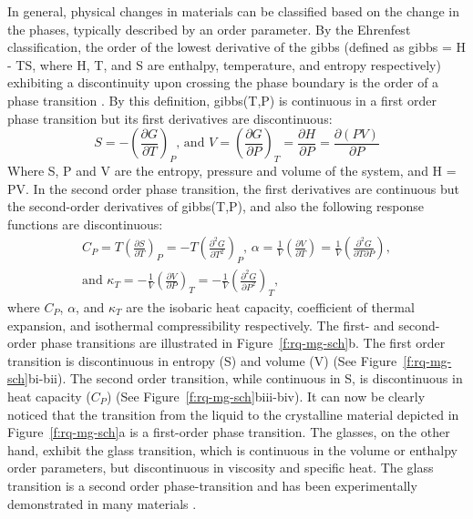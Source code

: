 In general, physical changes in materials can be classified based on the change in the phases, typically described by an order parameter. By the Ehrenfest classification, the order of the lowest derivative of the \glsdesc{gibbs} (defined as \gls{gibbs} = H - TS, where H, T, and S are enthalpy, temperature, and entropy respectively) exhibiting a discontinuity upon crossing the phase boundary is the order of a phase transition \cite{Jaeger1998}. By this definition, \gls{gibbs}(T,P) is continuous in a first order phase transition but its first derivatives are discontinuous:
\begin{equation}
	S = - \left( \frac{\partial G}{\partial T} \right)_P \text{, and } V = \left( \frac{\partial G}{\partial P} \right)_T = \frac{\partial H}{\partial P} =  \frac{\partial (PV)}{\partial P}
\end{equation}
Where S, P and V are the entropy, pressure and volume of the system, and H = PV. In the second order phase transition, the first derivatives are continuous but the second-order derivatives of \gls{gibbs}(T,P), and also the following response functions are discontinuous:
\begin{equation}
\begin{gathered}
C_P = T\left(\frac{\partial S}{\partial T} \right)_P = -T \left( \frac{\partial^2 G}{\partial T^2} \right)_P \text{, } \alpha = \frac{1}{V} \left(\frac{\partial V}{\partial T} \right) = \frac{1}{V} \left(\frac{\partial^2 G}{\partial T \partial P} \right), \\
\text{and }\kappa_T = -\frac{1}{V} \left(\frac{\partial V}{\partial P} \right)_T = -\frac{1}{V} \left( \frac{\partial^2 G}{\partial P^2} \right)_T\text{,}
\end{gathered}
\end{equation}
where $C_P$, $\alpha$, and $\kappa _T$ are the isobaric heat capacity, coefficient of thermal expansion, and isothermal compressibility respectively. The first- and second-order phase transitions are illustrated in Figure~\ref{f:rq-mg-sch}b. The first order transition is discontinuous in entropy (S) and volume (V) (See Figure~\ref{f:rq-mg-sch}bi-bii). The second order transition, while continuous in S, is discontinuous in heat capacity ($C_P$) (See Figure~\ref{f:rq-mg-sch}biii-biv). It can now be clearly noticed that the transition from the liquid to the crystalline material depicted in Figure~\ref{f:rq-mg-sch}a is a first-order phase transition. The glasses, on the other hand, exhibit the glass transition, which is continuous in the volume or enthalpy order parameters, but discontinuous in viscosity and specific heat. The glass transition is a second order phase-transition \cite{Cohen1959,Berthier2016} and has been experimentally demonstrated in many materials \cite{Kauzmann1948}. \par

